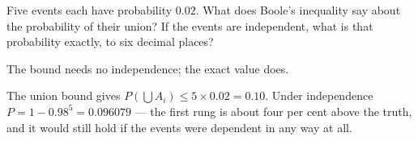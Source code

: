 \begin{problem}[stretch]
Five events each have probability $0.02$. What does Boole's
inequality say about the probability of their union? If the events
are independent, what is that probability exactly, to six decimal
places?
\begin{hint}
The bound needs no independence; the exact value does.
\end{hint}
\begin{solution}
The union bound gives $P(\bigcup A_i) \le 5 \times 0.02 = 0.10$.
Under independence $P = 1 - 0.98^5 = 0.096079$ — the first rung is
about four per cent above the truth, and it would still hold if the
events were dependent in any way at all.
\end{solution}
\end{problem}
